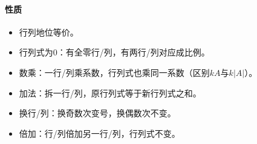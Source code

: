 \documentclass[
12pt, %
a4paper, 
oneside, %
headinclude,footinclude, %
]{scrartcl}
\begin{document}
\paragraph{性质}
\begin{itemize}
\item 行列地位等价。
\item 行列式为$ 0 $：有全零行/列，有两行/列对应成比例。
\item 数乘：一行/列乘系数，行列式也乘同一系数（区别$ kA $与$ k|A| $）。
\item 加法：拆一行/列，原行列式等于新行列式之和。
\item 换行/列：换奇数次变号，换偶数次不变。
\item 倍加：行/列倍加另一行/列，行列式不变。   
\end{itemize}
\end{document}
